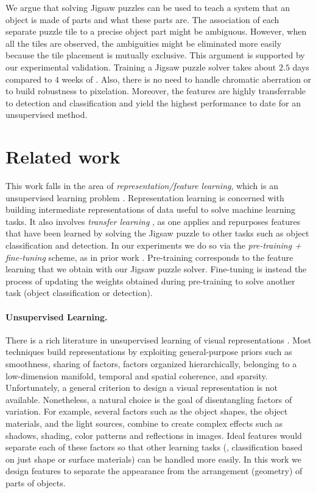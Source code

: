\documentclass[runningheads]{llncs}
\begin{document}
We argue that solving Jigsaw puzzles can be used to teach a system that an object is made of parts and what these parts are. The association of each separate puzzle tile to a precise object part might be ambiguous. However, when all the tiles are observed, the ambiguities might be eliminated more easily because the tile placement is mutually exclusive. This argument is supported by our experimental validation. Training a Jigsaw puzzle solver takes about $2.5$ days compared to $4$ weeks of \cite{Carl2015}. Also, there is no need to handle chromatic aberration or to build robustness to pixelation. Moreover, the features are highly transferrable to detection and classification and yield the highest performance to date for an unsupervised method. 

\section{Related work}

This work falls in the area of \emph{representation/feature learning}, which is an unsupervised learning problem \cite{Barlow89}. Representation learning is concerned with building intermediate representations of data useful to solve machine learning tasks. It also involves \emph{transfer learning} \cite{Yosinski}, as one applies and repurposes features that have been learned by solving the Jigsaw puzzle to other tasks such as object classification and detection.
In our experiments we do so via the \emph{pre-training + fine-tuning} scheme, as in prior work \cite{agrawalCM15}. Pre-training corresponds to the feature learning that we obtain with our Jigsaw puzzle solver. Fine-tuning is instead the process of updating the weights obtained during pre-training to solve another task (object classification or detection).


\paragraph{\textbf{Unsupervised Learning.}} 

There is a rich literature in unsupervised learning of visual representations \cite{bengioCV12}. Most techniques build representations by exploiting general-purpose priors such as smoothness, sharing of factors, factors organized hierarchically, belonging to a low-dimension manifold, temporal and spatial coherence, and sparsity. Unfortunately, a general criterion to design a visual representation is not available. Nonetheless, a natural choice is the goal of disentangling factors of variation. For example, several factors such as the object shapes, the object materials, and the light sources, combine to create complex effects such as shadows, shading, color patterns and reflections in images. Ideal features would separate each of these factors so that other learning tasks (\eg, classification based on just shape or surface materials) can be handled more easily. In this work we design features to separate the appearance from the arrangement (geometry) of parts of objects.
\end{document}
